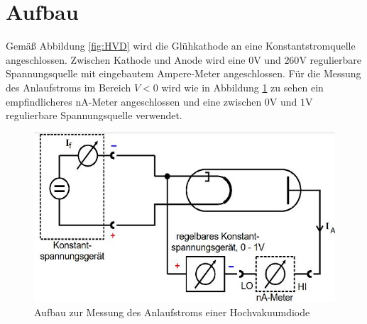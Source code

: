 \section{Aufbau}
\label{sec:Aufbau}
Gemäß Abbildung \ref{fig:HVD} wird die Glühkathode an eine Konstantstromquelle angeschlossen. Zwischen Kathode und Anode wird eine $0\si{\volt}$ und $260\si{\volt}$ regulierbare Spannungsquelle mit eingebautem Ampere-Meter angeschlossen.
Für die Messung des Anlaufstroms im Bereich $V<0$ wird wie in Abbildung \ref{fig:aufbau} zu sehen ein empfindlicheres $\si{\nano\ampere}$-Meter angeschlossen und eine zwischen $0\si{\volt}$ und $1\si{\volt}$ regulierbare Spannungsquelle verwendet.
\begin{figure}
\centering
\includegraphics[width=\linewidth-70pt,height=\textheight-70pt,keepaspectratio]{content/images/aufbau.jpg}
\caption{Aufbau zur Messung des Anlaufstroms einer Hochvakuumdiode\cite{V504}}
\label{fig:aufbau}
\end{figure}
